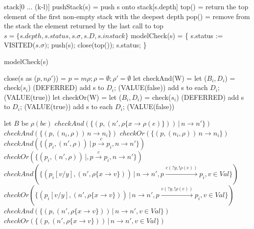 \documentclass[runningheads,a4paper]{llncs}
\begin{document}
\begin{algorithm} 
	\begin{algorithmic}[1]
		\State stack[0 ... (k-l)]
		\State pushStack(s) = push s onto stack[s.depth]
		\State top() = return the top element of the first non-empty stack with the deepest depth
		\State pop() = remove from the stack the element returned by the last call to top 
		\State $s=\{s.depth, s.status, s.\sigma, s.D, s.instack\}$
		\State modelCheck(s) = \{ s.status := VISITED($s.\sigma)$; push(s);
		\State close(top()); \Return s.status; \}
		\EndWhile
		
	\end{algorithmic} 
	\caption{modelCheck(s)}
	\label{alg:algorithm1}
\end{algorithm}

\begin{algorithm} 
	\begin{algorithmic}[1]
		
		\State close(s as ($p, n\rho'$)) =
		\State $p = m\rho; \rho = \emptyset; \rho' = \emptyset$  
		\EndIf
		\State let checkAnd(W) =
		\State let ($B_{i}, D_{i}$) = check($s_{i}$) 
		\Return(DEFERRED)
		\State add s to $D_{i}$; \Return(VALUE(false))
		\Else 
		\State add s to each $D_{i}$; \Return(VALUE(true))
		\EndIf
		\EndFor
		\State let checkOr(W) =
		\State let ($B_{i}, D_{i}$) = check($s_{i}$) 
		\Return(DEFERRED)
		\State add s to $D_{i}$; \Return(VALUE(true))
		\Else 
		\State add s to each $D_{i}$; \Return(VALUE(false))
		\EndIf
		\EndFor
		
		
		\State  let $B$ be 
		\Return $\rho(be)$
		\EndCase
		\Return $checkAnd(\{ (p, (n', \rho\{x\rightarrow \rho(e)\}))\, |\, n \rightarrow n' \})$
		\EndCase
		\Case{$\wedge$} 
		\Return $checkAnd(\{ (p, (n_{i}, \rho))\, n\rightarrow n_{i}\}) $
		\EndCase
		\Case{$\vee$} 
		\Return $checkOr(\{ (p, (n_{i}, \rho))\, n\rightarrow n_{i} \})$
		\EndCase
		\Case{[c]} 
		\Return $checkAnd(\{ (p_{i}, (n', \rho))\,|\, p \xrightarrow{c} p_{i}, n\rightarrow n' \})$
		\EndCase
		\Return $checkOr(\{ (p_{i}, (n',\rho))\,|, p \xrightarrow{c} p_{i}, n \rightarrow n'\})$
		\EndCase
		\Case{[c(?x, !e)]}
		\Return $ checkAnd(\{ (p_{i}[v/y], (n',\rho\{x \rightarrow v\}))\,|\,  n \rightarrow n', p \xrightarrow{c(?y, !\rho(e)) } p_{i},v\in Val\})$
		\EndCase
		\Return $ checkOr(\{ (p_{i}[v/y], (n', \rho\{x \rightarrow v\}))\,|\,  n \rightarrow n', p \xrightarrow{c(?y, !\rho(e))} p_{i},v\in Val\})$
		\EndCase
		\Return $  checkAnd(\{ (p, (n',\rho\{x \rightarrow v\}))\,|\, n \rightarrow n', v \in Val\})$
		\EndCase
		\Return $ checkOr(\{ (p, (n',\rho\{x \rightarrow v\}))\,|\,  n \rightarrow n', v\in Val\})$
		\EndCase
		\EndSwitch
		

\end{algorithmic}
\end{algorithm}
\end{document}
